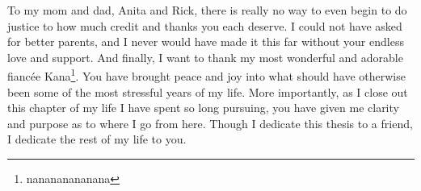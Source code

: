 To my mom and dad, Anita and Rick, there is really no way to even begin to do justice
    to how much credit and thanks you each deserve.
I could not have asked for better parents,
    and I never would have made it this far without your endless love and support.
And finally, I want to thank my most wonderful and adorable
    fianc\'ee Kana\footnote{nanananananana}.
You have brought peace and joy into what should have otherwise been
    some of the most stressful years of my life.
More importantly, as I close out this chapter of my life I have spent so long pursuing,
    you have given me clarity and purpose as to where I go from here.
Though I dedicate this thesis to a friend,
    I dedicate the rest of my life to you.
